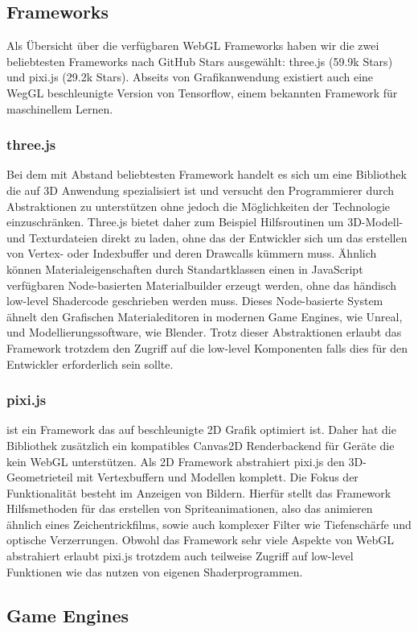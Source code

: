 \subsection{Frameworks}
Als Übersicht über die verfügbaren WebGL Frameworks haben wir die zwei beliebtesten Frameworks nach GitHub Stars ausgewählt: three.js (59.9k Stars) und pixi.js (29.2k Stars). Abseits von Grafikanwendung existiert auch eine WegGL beschleunigte Version von Tensorflow, einem bekannten Framework für maschinellem Lernen.
\subsubsection*{three.js} Bei dem mit Abstand beliebtesten Framework handelt es sich um eine Bibliothek die auf 3D Anwendung spezialisiert ist und versucht den Programmierer durch Abstraktionen zu unterstützen ohne jedoch die Möglichkeiten der Technologie einzuschränken. Three.js bietet daher zum Beispiel Hilfsroutinen um 3D-Modell- und Texturdateien direkt zu laden, ohne das der Entwickler sich um das erstellen von Vertex- oder Indexbuffer und deren Drawcalls kümmern muss. Ähnlich können Materialeigenschaften durch Standartklassen \bzw einen in JavaScript verfügbaren Node-basierten Materialbuilder erzeugt werden, ohne das händisch low-level Shadercode geschrieben werden muss. Dieses Node-basierte System ähnelt den Grafischen Materialeditoren in modernen Game Engines, wie \zb Unreal, und Modellierungssoftware, wie \zb Blender. Trotz dieser Abstraktionen erlaubt das Framework trotzdem den Zugriff auf die low-level Komponenten falls dies für den Entwickler erforderlich sein sollte.
\subsubsection*{pixi.js} ist ein Framework das auf beschleunigte 2D Grafik optimiert ist. Daher hat die Bibliothek zusätzlich ein kompatibles Canvas2D Renderbackend für Geräte die kein WebGL unterstützen. Als 2D Framework abstrahiert pixi.js den 3D-Geometrieteil mit Vertexbuffern und Modellen komplett. Die Fokus der Funktionalität besteht im Anzeigen von Bildern. Hierfür stellt das Framework Hilfsmethoden für das erstellen von Spriteanimationen, also das animieren ähnlich eines Zeichentrickfilms, sowie auch komplexer Filter wie Tiefenschärfe und optische Verzerrungen. Obwohl das Framework sehr viele Aspekte von WebGL abstrahiert erlaubt pixi.js trotzdem auch teilweise Zugriff auf low-level Funktionen wie das nutzen von eigenen Shaderprogrammen.
\subsection{Game Engines}
